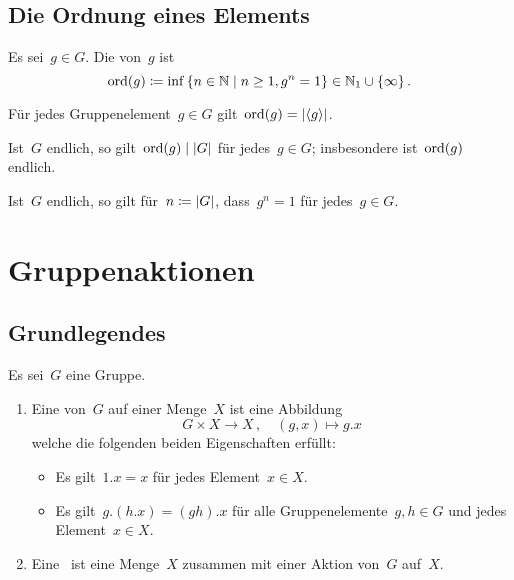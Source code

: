 \subsection{Die Ordnung eines Elements}

\begin{definition}
  Es sei~$g \in G$.
  Die  von~$g$ ist
  \[
    \ord(g)
    \defined
    \inf
    {}
    \{
      n \in \Natural
    \suchthat
      n \geq 1,
      g^n = 1
    \}
    \in
    \Natural_1 \cup \{ \infty \} \,.
  \]
\end{definition}

\begin{proposition}
  Für jedes Gruppenelement~$g \in G$ gilt~$\operatorname{ord}(g) = \lvert\langle g\rangle\rvert$.
\end{proposition}

\begin{corollary}
  Ist~$G$ endlich, so gilt~$\operatorname{ord}(g) \mid \lvert G\rvert$ für jedes~$g \in G$;
  insbesondere ist~$\operatorname{ord}(g)$ endlich.
\end{corollary}

\begin{corollary}
  Ist~$G$ endlich, so gilt für~$n \coloneqq \lvert G\rvert$, dass~$g^n = 1$ für jedes~$g \in G$.
\end{corollary}





\section{Gruppenaktionen}



\subsection{Grundlegendes}

\begin{definition}
  Es sei~$G$ eine Gruppe.
  \begin{enumerate}
    \item
      Eine  von~$G$ auf einer Menge~$X$  ist eine Abbildung
      \[
        G \times X \to X \,,
        \quad
        (g,x)
        \mapsto
        g.x
      \]
      welche die folgenden beiden Eigenschaften erfüllt:
      \begin{itemize}
        \item
          Es gilt~$1.x = x$ für jedes Element~$x \in X$.
        \item
          Es gilt~$g.(h.x) = (gh).x$ für alle Gruppenelemente~$g, h \in G$ und jedes Element~$x \in X$. 
      \end{itemize}
    \item
      Eine~ ist eine Menge~$X$ zusammen mit einer Aktion von~$G$ auf~$X$.
  \end{enumerate}
\end{definition}

